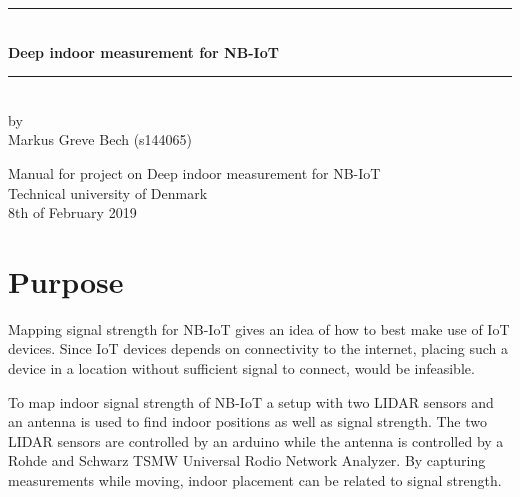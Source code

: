 \documentclass[a4paper,twoside, 12pt]{article}
\begin{document}
\begin{titlepage}
\centering


\rule{\textwidth}{1mm}\\
\vspace{1cm}
\Huge\bfseries Deep indoor measurement for NB-IoT\\
\vspace{0.7cm}
\rule{\textwidth}{1mm}\\
\vspace{3cm}
\large by\\
Markus Greve Bech (s144065) \\

\normalsize
\begin{flushleft}
Manual for project on Deep indoor measurement for NB-IoT\\
Technical university of Denmark\\
8th of February 2019
\end{flushleft}
\end{titlepage}
\thispagestyle{plain}

 \newpage
\tableofcontents
\thispagestyle{plain}
\newpage
{}

\section{Purpose}
Mapping signal strength for NB-IoT gives an idea of how to best make use of IoT devices. Since IoT devices depends on connectivity to the internet, placing such a device in a location without sufficient signal to connect, would be infeasible. 

To map indoor signal strength of NB-IoT a setup with two LIDAR sensors and an antenna is used to find indoor positions as well as signal strength. The two LIDAR sensors are controlled by an arduino while the antenna is controlled by a Rohde and Schwarz TSMW Universal Rodio Network Analyzer. By capturing measurements while moving, indoor placement can be related to signal strength.
\end{document}
